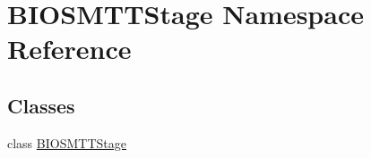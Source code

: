 \hypertarget{namespaceBIOSMTTStage}{\section{B\-I\-O\-S\-M\-T\-T\-Stage Namespace Reference}
\label{namespaceBIOSMTTStage}
}
\subsection*{Classes}
\begin{DoxyCompactItemize}
\item 
class \hyperlink{classBIOSMTTStage_1_1BIOSMTTStage}{B\-I\-O\-S\-M\-T\-T\-Stage}
\end{DoxyCompactItemize}
